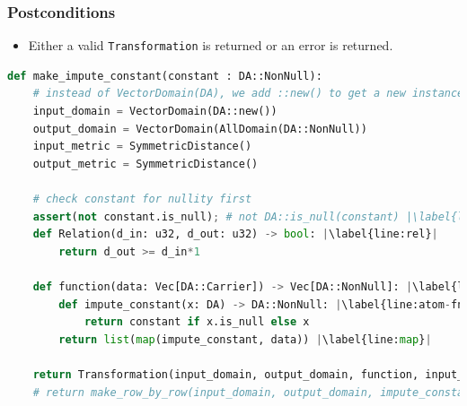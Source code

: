 \documentclass[11pt,a4paper]{article}
\newcommand{\grace}[1]{{ {\color{purple}{(grace)~#1}}}}
\begin{document}
\subsubsection*{Postconditions}

\begin{itemize}
    \item Either a valid \texttt{Transformation} is returned or an error is returned.
\end{itemize}


\begin{lstlisting}[language=Python,  escapechar=|]
def make_impute_constant(constant : DA::NonNull):
    # instead of VectorDomain(DA), we add ::new() to get a new instance of DA. This is bcause DA has the ImputableDomain trait. Discuss among interns.
    input_domain = VectorDomain(DA::new())
    output_domain = VectorDomain(AllDomain(DA::NonNull))
    input_metric = SymmetricDistance()
    output_metric = SymmetricDistance()
    
    # check constant for nullity first
    assert(not constant.is_null); # not DA::is_null(constant) |\label{line:null}|
    def Relation(d_in: u32, d_out: u32) -> bool: |\label{line:rel}|
        return d_out >= d_in*1

    def function(data: Vec[DA::Carrier]) -> Vec[DA::NonNull]: |\label{line:fn}|
        def impute_constant(x: DA) -> DA::NonNull: |\label{line:atom-fn}|
            return constant if x.is_null else x
        return list(map(impute_constant, data)) |\label{line:map}|
        
    return Transformation(input_domain, output_domain, function, input_metric, output_metric, stability_relation=Relation)
    # return make_row_by_row(input_domain, output_domain, impute_constant);
\end{lstlisting}

\grace{ Will need to change pseudocode so that it returns the result of a make row by row transformation (which the code does) instead of a Transformation directly.}
\end{document}
